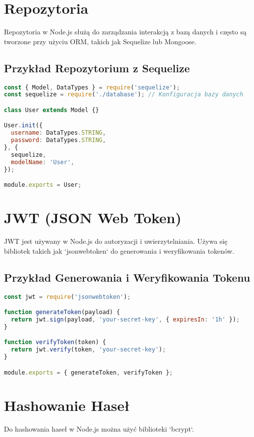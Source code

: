 \documentclass[a4paper,12pt]{article}
\begin{document}
\section{Repozytoria}
Repozytoria w Node.js służą do zarządzania interakcją z bazą danych i często są tworzone przy użyciu ORM, takich jak Sequelize lub Mongoose.

\subsection{Przykład Repozytorium z Sequelize}
\begin{lstlisting}[language=JavaScript, caption=Przykład repozytorium z Sequelize]
const { Model, DataTypes } = require('sequelize');
const sequelize = require('./database'); // Konfiguracja bazy danych

class User extends Model {}

User.init({
  username: DataTypes.STRING,
  password: DataTypes.STRING,
}, {
  sequelize,
  modelName: 'User',
});

module.exports = User;
\end{lstlisting}

\section{JWT (JSON Web Token)}
JWT jest używany w Node.js do autoryzacji i uwierzytelniania. Używa się bibliotek takich jak `jsonwebtoken` do generowania i weryfikowania tokenów.

\subsection{Przykład Generowania i Weryfikowania Tokenu}
\begin{lstlisting}[language=JavaScript, caption=Przykład użycia JWT w Node.js]
const jwt = require('jsonwebtoken');

function generateToken(payload) {
  return jwt.sign(payload, 'your-secret-key', { expiresIn: '1h' });
}

function verifyToken(token) {
  return jwt.verify(token, 'your-secret-key');
}

module.exports = { generateToken, verifyToken };
\end{lstlisting}

\section{Hashowanie Haseł}
Do hashowania haseł w Node.js można użyć biblioteki `bcrypt`.
\end{document}

